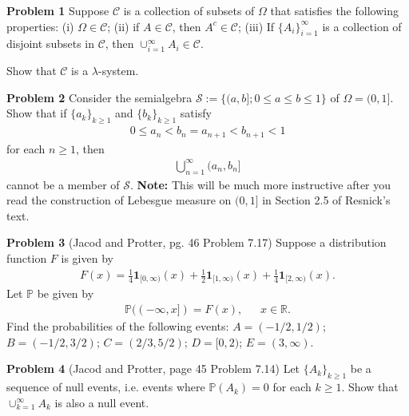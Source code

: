 \documentclass{article}
\begin{document}
\vspace{3 mm}

\noindent \textbf{Problem 1} Suppose $\mathcal{C}$ is a collection of subsets of $\Omega$ that satisfies the following properties:  (i) $\Omega \in \mathcal{C}$; (ii) if $A \in \mathcal{C}$, then $A^{c} \in \mathcal{C}$; (iii) If $\{A_{i}\}_{i = 1}^{\infty}$ is a collection of disjoint subsets in $\mathcal{C}$, then $\cup_{i=1}^{\infty}A_{i} \in \mathcal{C}$.

\vspace{2 mm}

Show that $\mathcal{C}$ is a $\lambda$-system.

\vspace{3 mm}

\noindent \textbf{Problem 2} Consider the semialgebra $\mathcal{S} := \{(a,b]; 0 \leq a \leq b \leq 1\}$ of $\Omega = (0,1]$.  Show that if $\{a_{k}\}_{k \geq 1}$ and $\{b_{k}\}_{k \geq 1}$ satisfy
\begin{eqnarray*} 0 \leq a_{n} < b_{n} = a_{n+1} < b_{n+1} < 1 \end{eqnarray*} for each $n \geq 1$, then
\begin{eqnarray*} \bigcup_{n=1}^{\infty}(a_{n}, b_{n}] \end{eqnarray*} cannot be a member of $\mathcal{S}$.  \textbf{Note:} This will be much more instructive after you read the construction of Lebesgue measure on $(0,1]$ in Section 2.5 of Resnick's text.

\vspace{3 mm}

\noindent \textbf{Problem 3} (Jacod and Protter, pg. 46 Problem 7.17) Suppose a distribution function $F$ is given by
\begin{eqnarray*} F(x) = \frac{1}{4}\mathbf{1}_{[0, \infty)}(x) + \frac{1}{2}\mathbf{1}_{[1,\infty)}(x) + \frac{1}{4}\mathbf{1}_{[2,\infty)}(x). \end{eqnarray*}  Let $\mathbb{P}$ be given by
\begin{eqnarray*} \mathbb{P}((-\infty, x]) = F(x), ~~~~~~~ x \in \mathbb{R}. \end{eqnarray*}  Find the probabilities of the following events:  $A = (-1/2, 1/2)$; $B = (-1/2, 3/2)$; $C = (2/3, 5/2)$; $D = [0,2)$; $E = (3,\infty)$.

\vspace{2 mm}

\noindent \textbf{Problem 4} (Jacod and Protter, page 45 Problem 7.14) Let $\{A_{k}\}_{k \geq 1}$ be a sequence of null events, i.e. events where $\mathbb{P}(A_{k}) = 0$ for each $k \geq 1$.  Show that $\cup_{k=1}^{\infty}A_{k}$ is also a null event.
\end{document}
